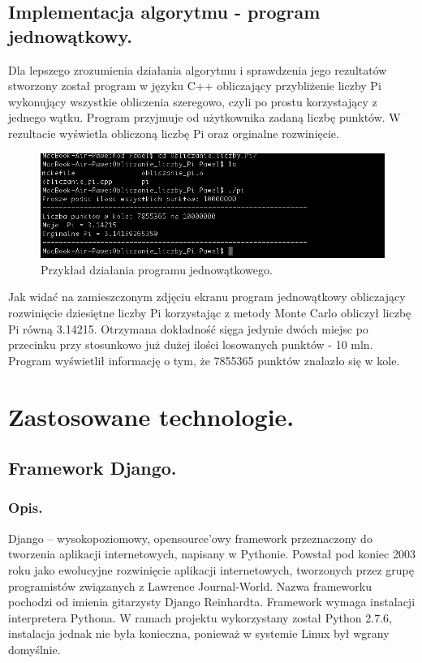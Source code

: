 \documentclass[a4paper,12pt]{article}		%
\begin{document}
\subsection{Implementacja algorytmu - program jednowątkowy.} 
Dla lepszego zrozumienia działania algorytmu i sprawdzenia jego rezultatów stworzony został program w języku C++ obliczający przybliżenie liczby Pi wykonujący wszystkie obliczenia szeregowo, czyli po prostu korzystający z jednego wątku. Program przyjmuje od użytkownika zadaną liczbę punktów. W rezultacie wyświetla obliczoną liczbę Pi oraz orginalne rozwinięcie.

\begin{figure}[h!]
\centering
\includegraphics[scale=0.6]{Resources/Screen_Program_JedenWatek}
\caption{Przykład działania programu jednowątkowego.} 
\end{figure}
Jak widać na zamieszczonym zdjęciu ekranu program jednowątkowy obliczający rozwinięcie dziesiętne liczby Pi korzystając z metody Monte Carlo obliczył liczbę Pi równą 3.14215. Otrzymana dokładność sięga jedynie dwóch miejsc po przecinku przy stosunkowo już dużej ilości losowanych punktów - 10 mln. Program wyświetlił informację o tym, że 7855365 punktów znalazło się w kole.
\section{Zastosowane technologie.}
\subsection{Framework Django.}
\subsubsection{Opis.}
Django – wysokopoziomowy, opensource’owy framework przeznaczony do tworzenia aplikacji internetowych, napisany w Pythonie. Powstał pod koniec 2003 roku jako ewolucyjne rozwinięcie aplikacji internetowych, tworzonych przez grupę programistów związanych z Lawrence Journal-World. Nazwa frameworku pochodzi od imienia gitarzysty Django Reinhardta.
Framework wymaga instalacji interpretera Pythona. W ramach projektu wykorzystany został Python 2.7.6, instalacja jednak nie była konieczna, ponieważ w systemie Linux był wgrany domyślnie.
\end{document}
